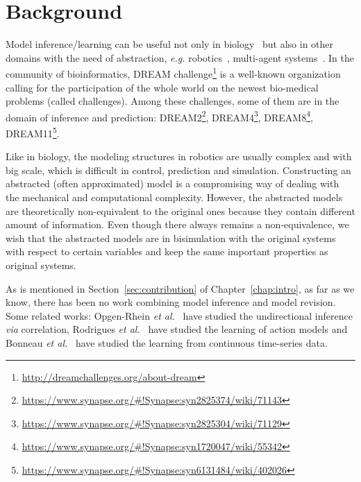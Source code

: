 \section{Background}
Model inference/learning can be useful not only in biology~\cite{ribeiro2015learning} but also in other domains with the need of abstraction, \textit{e.g.} robotics~\cite{nguyen2011model}, multi-agent systems~\cite{foerster2016learning}.
In the community of bioinformatics, DREAM  challenge\footnote{\url{http://dreamchallenges.org/about-dream}} is a well-known organization calling for the participation of the whole world on the newest bio-medical problems (called challenges). 
Among these challenges, some of them are in the domain of inference and prediction:
DREAM2\footnote{\url{https://www.synapse.org/\#!Synapse:syn2825374/wiki/71143}},
DREAM4\footnote{\url{https://www.synapse.org/\#!Synapse:syn2825304/wiki/71129}},
DREAM8\footnote{\url{https://www.synapse.org/\#!Synapse:syn1720047/wiki/55342}},
DREAM11\footnote{\url{https://www.synapse.org/\#!Synapse:syn6131484/wiki/402026}}.

Like in biology, the modeling structures in robotics are usually complex and with big scale, which is difficult in control, prediction and simulation.
Constructing an abstracted (often approximated) model is a compromising way of dealing with the mechanical and computational complexity.
However, the abstracted models are theoretically non-equivalent to the original ones because they contain different amount of information.
Even though there always remains a  %
non-equivalence, we wish that the abstracted models are in bisimulation with the original systems with respect to certain variables and keep the same important properties as original systems.

As is mentioned in Section~\ref{sec:contribution} of Chapter~\ref{chap:intro}, as far as we know, there has been no work combining model inference and model revision.
Some related works: Opgen-Rhein \textit{et al.}~\cite{opgen2007correlation} %
have studied the undirectional inference \textit{via} correlation, Rodrigues \textit{et al.}~\cite{rodrigues2011active} have studied the learning of action models and Bonneau \textit{et al.}~\cite{bonneau2006inferelator} have studied the learning from continuous time-series data.


